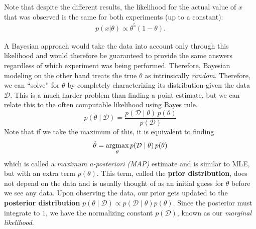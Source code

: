 Note that despite the different results, the likelihood for the actual value of $x$ that was observed is the same for both experiments (up to a constant):
\begin{align}
  p(x|\theta) \propto \theta^5(1-\theta).
\end{align}

A Bayesian approach would take the data into account only through this likelihood and would therefore be guaranteed to provide the same answers regardless of which experiment was being performed. Therefore, Bayesian modeling on the other hand treats the true $\theta$ as intrinsically \textit{random}. Therefore, we can ``solve'' for $\theta$ by completely characterizing its distribution given the data $\mathcal{D}$. This is a much harder problem than finding a point estimate, but we can relate this to the often computable likelihood using Bayes rule. 
\begin{equation}
  p(\theta \mid \mathcal{D}) = \frac{p(\mathcal{D} \mid \theta) \, p(\theta)}{p(\mathcal{D})}
\end{equation}
Note that if we take the maximum of this, it is equivalent to finding 
\begin{equation}
  \hat{\theta} = \argmax_{\theta} p(\mathcal{D} \mid \theta) \, p(\theta)
\end{equation}
which is called a \textit{maximum a-posteriori (MAP)} estimate and is similar to MLE, but with an extra term $p(\theta)$. This term, called the \textbf{prior distribution}, does not depend on the data and is usually thought of as an initial guess for $\theta$ before we see any data. Upon observing the data, our prior gets updated to the \textbf{posterior distribution} $p(\theta \mid \mathcal{D}) \propto p(\mathcal{D} \mid \theta) p (\theta)$. Since the posterior must integrate to $1$, we have the normalizing constant $p(\mathcal{D})$, known as our \textit{marginal likelihood}. 

